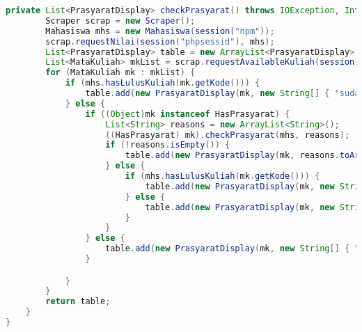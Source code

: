 \begin{lstlisting}[language=Java,basicstyle=\tiny,caption=Applicstion.java]
	private List<PrasyaratDisplay> checkPrasyarat() throws IOException, InterruptedException {
		Scraper scrap = new Scraper();
		Mahasiswa mhs = new Mahasiswa(session("npm"));
		scrap.requestNilai(session("phpsessid"), mhs);
		List<PrasyaratDisplay> table = new ArrayList<PrasyaratDisplay>();
		List<MataKuliah> mkList = scrap.requestAvailableKuliah(session("phpsessid"));
		for (MataKuliah mk : mkList) {
			if (mhs.hasLulusKuliah(mk.getKode())) {
				table.add(new PrasyaratDisplay(mk, new String[] { "sudah lulus" }));
			} else {
				if ((Object)mk instanceof HasPrasyarat) {
					List<String> reasons = new ArrayList<String>();
					((HasPrasyarat) mk).checkPrasyarat(mhs, reasons);
					if (!reasons.isEmpty()) {
						table.add(new PrasyaratDisplay(mk, reasons.toArray(new String[reasons.size()])));
					} else {
						if (mhs.hasLulusKuliah(mk.getKode())) {
							table.add(new PrasyaratDisplay(mk, new String[] { "sudah lulus" }));
						} else {
							table.add(new PrasyaratDisplay(mk, new String[] { "memenuhi syarat" }));
						}
					}
				} else {
					table.add(new PrasyaratDisplay(mk, new String[] { "tidak memiliki prasyarat" }));
				}

			}
		}
		return table;
	}
}
\end{lstlisting}
